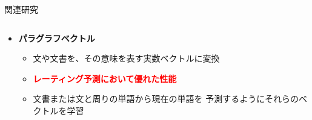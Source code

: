 \documentclass[unicode,10pt]{beamer}
\newcommand{\itemtitle}[1]{\textbf{#1}\\}
\newcommand{\fire}[1]{\textcolor{red}{\textbf{#1}}}
\newcommand{\doublecolumns}[4]{
    \begin{minipage}[t]{#1}
      #2
    \end{minipage}
    \begin{minipage}[t]{#3}
      #4
    \end{minipage}}
\begin{document}
\begin{frame}[t]
\begin{block}{関連研究}
\begin{columns}[onlytextwidth,t]
    \begin{column}{0.375\textwidth}
      \begin{itemize}
        \item \itemtitle{パラグラフベクトル\cite{quoc14}}
          \begin{itemize}
            \item 文や文書を、その意味を表す実数ベクトルに変換
            \item \fire{レーティング予測において優れた性能}
            \item 文書または文と周りの単語から現在の単語を
                  予測するようにそれらのベクトルを学習
          \end{itemize}
      \end{itemize}
    \end{column}


\end{columns}
\end{block}
\end{frame}
\end{document}
